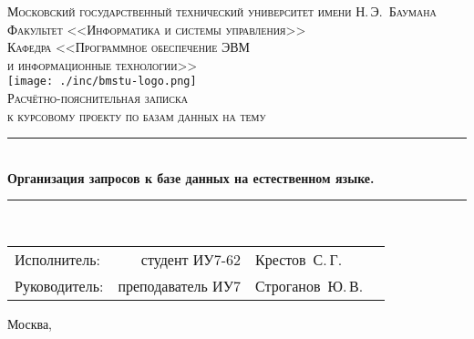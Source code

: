 \newcommand{\HRule}{\rule{\linewidth}{.5mm}\\}

\begin{center}

\textsc{\large Московский государственный технический университет имени Н.\,Э.~Баумана}\\[5mm]
\textsc{Факультет <<Информатика и системы управления>>}\\
\textsc{Кафедра <<Программное обеспечение ЭВМ\\и информационные технологии>>}\\[2.5mm]

\texttt{[image: ./inc/bmstu-logo.png]}\\[2.25cm]

\textsc{\large Расчётно-пояснительная записка}\\
\textsc{к курсовому проекту по базам данных на тему}

\HRule
{\huge \bfseries Организация запросов к базе данных на естественном языке.}
\HRule

\vfill

\begin{flushright}
  \begin{tabular}{lrlc}
    Исполнитель:  &    студент ИУ7-62 & Крестов~С.\,Г.   & \underline{\hspace{3cm}}\\[1cm]
    Руководитель: & преподаватель ИУ7 & Строганов~Ю.\,В. & \underline{\hspace{3cm}}\\[1cm]
  \end{tabular}
\end{flushright}

{\large Москва, \the\year}

\end{center}

\newpage
{}
